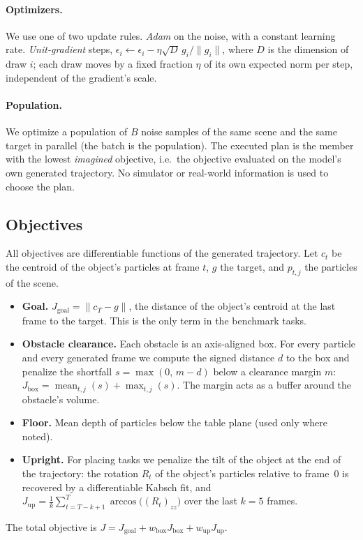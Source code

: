 \paragraph{Optimizers.}
We use one of two update rules.
\emph{Adam} on the noise, with a constant learning rate.
\emph{Unit-gradient} steps, $\epsilon_i \leftarrow \epsilon_i - \eta\sqrt{D}\, g_i/\lVert g_i\rVert$, where $D$ is the
dimension of draw $i$; each draw moves by a fixed fraction $\eta$ of its own expected norm per step, independent of
the gradient's scale.

\paragraph{Population.}
We optimize a population of $B$ noise samples of the same scene and the same target in parallel (the batch is the
population). The executed plan is the member with the lowest \emph{imagined} objective, i.e.\ the objective evaluated
on the model's own generated trajectory. No simulator or real-world information is used to choose the plan.

\subsection{Objectives}
\label{sec:objectives}

All objectives are differentiable functions of the generated trajectory. Let $c_t$ be the centroid of the object's
particles at frame $t$, $g$ the target, and $p_{t,j}$ the particles of the scene.

\begin{itemize}
  \item \textbf{Goal.} $J_{\text{goal}} = \lVert c_T - g \rVert$, the distance of the object's centroid at the last
        frame to the target. This is the only term in the benchmark tasks.
  \item \textbf{Obstacle clearance.} Each obstacle is an axis-aligned box. For every particle and every generated
        frame we compute the signed distance $d$ to the box and penalize the shortfall
        $s = \max(0,\, m - d)$ below a clearance margin $m$:
        $J_{\text{box}} = \operatorname{mean}_{t,j}(s) + \max_{t,j}(s)$.
        The margin acts as a buffer around the obstacle's volume.
  \item \textbf{Floor.} Mean depth of particles below the table plane (used only where noted).
  \item \textbf{Upright.} For placing tasks we penalize the tilt of the object at the end of the trajectory:
        the rotation $R_t$ of the object's particles relative to frame~0 is recovered by a differentiable Kabsch fit,
        and $J_{\text{up}} = \frac{1}{k}\sum_{t=T-k+1}^{T} \arccos\big((R_t)_{zz}\big)$ over the last $k = 5$ frames.
\end{itemize}
The total objective is $J = J_{\text{goal}} + w_{\text{box}}J_{\text{box}} + w_{\text{up}}J_{\text{up}}$.

